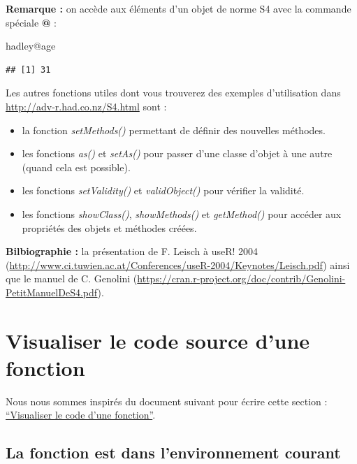 \documentclass[
]{book}
\newenvironment{Shaded}{\begin{snugshade}}{\end{snugshade}}
\newcommand{\NormalTok}[1]{#1}
\newcommand{\SpecialCharTok}[1]{\textcolor[rgb]{0.00,0.00,0.00}{#1}}
\theoremstyle{definition}
\theoremstyle{definition}
\theoremstyle{definition}
\theoremstyle{definition}
\theoremstyle{remark}
\begin{document}
\textbf{Remarque :} on accède aux éléments d'un objet de norme S4 avec la commande spéciale \textbf{@} :

\begin{Shaded}
\begin{Highlighting}[]
\NormalTok{hadley}\SpecialCharTok{@}\NormalTok{age}
\end{Highlighting}
\end{Shaded}

\begin{verbatim}
## [1] 31
\end{verbatim}

Les autres fonctions utiles dont vous trouverez des exemples d'utilisation dans \url{http://adv-r.had.co.nz/S4.html} sont :

\begin{itemize}
\item
  la fonction \emph{setMethods()} permettant de définir des nouvelles méthodes.
\item
  les fonctions \emph{as()} et \emph{setAs()} pour passer d'une classe d'objet à une autre (quand cela est possible).
\item
  les fonctions \emph{setValidity()} et \emph{validObject()} pour vérifier la validité.
\item
  les fonctions \emph{showClass()}, \emph{showMethods()} et \emph{getMethod()} pour accéder aux propriétés des objets et méthodes créées.
\end{itemize}

\textbf{Bilbiographie :} la présentation de F. Leisch à useR! 2004 (\url{http://www.ci.tuwien.ac.at/Conferences/useR-2004/Keynotes/Leisch.pdf}) ainsi que le manuel de C. Genolini (\url{https://cran.r-project.org/doc/contrib/Genolini-PetitManuelDeS4.pdf}).

\hypertarget{visualiser-le-code-source-dune-fonction}{%
\section{Visualiser le code source d'une fonction}\label{visualiser-le-code-source-dune-fonction}}

Nous nous sommes inspirés du document suivant pour écrire cette section : \href{https://informatique-mia.inra.fr/r4ciam/sites/default/files/download/tutoriels/T-methods-fev16.pdf}{``Visualiser le code d'une fonction''}.

\hypertarget{la-fonction-est-dans-lenvironnement-courant}{%
\subsection{La fonction est dans l'environnement courant}\label{la-fonction-est-dans-lenvironnement-courant}}
\end{document}

